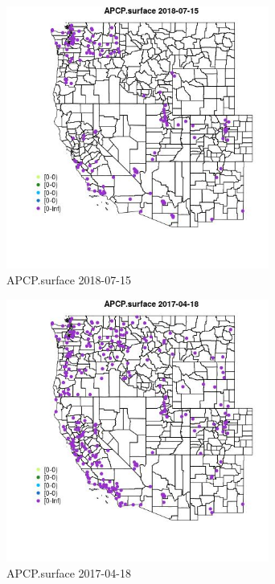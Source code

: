 \begin{figure} 
\centering  
\includegraphics[width=0.77\textwidth]{Code_Outputs/Report_ML_input_PM25_Step4_part_e_de_duplicated_aves_compiled_2019-05-21wNAs_MapObsAPCPsurface2018-07-15.jpg} 
\caption{\label{fig:Report_ML_input_PM25_Step4_part_e_de_duplicated_aves_compiled_2019-05-21wNAsMapObsAPCPsurface2018-07-15}APCP.surface 2018-07-15} 
\end{figure} 
 

\begin{figure} 
\centering  
\includegraphics[width=0.77\textwidth]{Code_Outputs/Report_ML_input_PM25_Step4_part_e_de_duplicated_aves_compiled_2019-05-21wNAs_MapObsAPCPsurface2017-04-18.jpg} 
\caption{\label{fig:Report_ML_input_PM25_Step4_part_e_de_duplicated_aves_compiled_2019-05-21wNAsMapObsAPCPsurface2017-04-18}APCP.surface 2017-04-18} 
\end{figure} 
 

